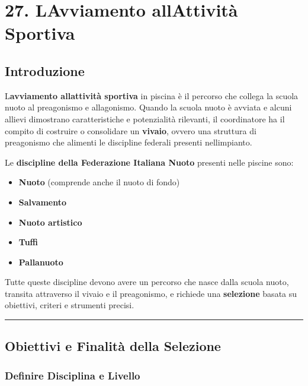 \documentclass[a4paper,11pt]{article}
\providecommand{\tightlist}{%
  \setlength{\itemsep}{0pt}\setlength{\parskip}{0pt}}
\begin{document}
\section{27. L\textquotesingle Avviamento all\textquotesingle Attività
  Sportiva}\label{lavviamento-allattivituxe0-sportiva}

\subsection{Introduzione}\label{introduzione-26}

L\textquotesingle{}\textbf{avviamento all\textquotesingle attività
      sportiva} in piscina è il percorso che collega la scuola nuoto al
preagonismo e all\textquotesingle agonismo. Quando la scuola nuoto è
avviata e alcuni allievi dimostrano caratteristiche e potenzialità
rilevanti, il coordinatore ha il compito di costruire o consolidare un
\textbf{vivaio}, ovvero una struttura di preagonismo che alimenti le
discipline federali presenti nell\textquotesingle impianto.

Le \textbf{discipline della Federazione Italiana Nuoto} presenti nelle
piscine sono:

\begin{itemize}
      \tightlist
      \item
            \textbf{Nuoto} (comprende anche il nuoto di fondo)
      \item
            \textbf{Salvamento}
      \item
            \textbf{Nuoto artistico}
      \item
            \textbf{Tuffi}
      \item
            \textbf{Pallanuoto}
\end{itemize}

Tutte queste discipline devono avere un percorso che nasce dalla scuola
nuoto, transita attraverso il vivaio e il preagonismo, e richiede una
\textbf{selezione} basata su obiettivi, criteri e strumenti precisi.

\begin{center}\rule{0.5\linewidth}{0.5pt}\end{center}

\subsection{Obiettivi e Finalità della
      Selezione}\label{obiettivi-e-finalituxe0-della-selezione}

\subsubsection{Definire Disciplina e
      Livello}\label{definire-disciplina-e-livello}
\end{document}
